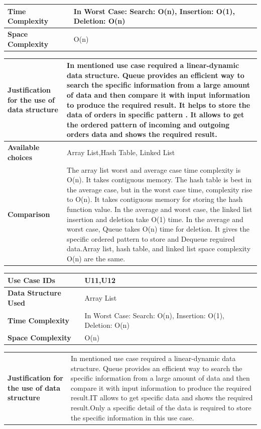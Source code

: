 \documentclass[12pt,a4paper]{report}
\begin{document}
\begin{center}
\begin{tabular}{ | m{4cm}|m{12cm}| }
\textbf{Time Complexity}& 
In Worst Case: Search: O(n), Insertion: O(1), Deletion: O(n)\\\hline
\textbf{Space Complexity}& O(n)\\\hline

 \end{tabular}
\begin{tabular}{ | m{4cm}|m{12cm}| }\hline
\textbf{Justification for the use of data structure}&
In mentioned use case required a linear-dynamic data structure. 
Queue provides an efficient way to search the specific information from a large amount of data and then compare it with input information to produce the required result. It helps to store the data of orders in specific pattern . It allows  to get the ordered pattern of incoming and outgoing orders data and shows the required result.
 
 \\ \hline
\textbf{Available choices}& Array List,Hash Table, Linked List \\ \hline
\textbf{Comparison}&
The array list worst and average case time complexity is O(n). It takes contiguous memory. The hash table is best in the average case, but in the worst case time, complexity rise to O(n). It takes contiguous memory for storing the hash function value. In the average and worst case, the linked list insertion and deletion take O(1) time. In the average and worst case, Queue takes O(n) time for deletion. It gives the specific ordered pattern to store and Dequeue reguired data.Array list, hash table, and linked list space complexity O(n) are the same.
 \\ \hline
\end{tabular}

\begin{tabular}{ | m{4cm}|m{12cm}| }\hline
\textbf{Use Case IDs}& U11,U12 \\ \hline
\textbf{Data Structure Used}& Array List \\ \hline

\textbf{Time Complexity}& 
In Worst Case: Search: O(n), Insertion: O(1), Deletion: O(n)\\\hline
\textbf{Space Complexity}& O(n)\\\hline

 \end{tabular}
\begin{tabular}{ | m{4cm}|m{12cm}| }\hline
\textbf{Justification for the use of data structure}&
In mentioned use case required a linear-dynamic data structure. 
Queue provides an efficient way to search the specific information from a large amount of data and then compare it with input information to produce the required result.IT allows to get specific data and shows  the required result.Only a specific detail of the data is required to store the specific information in this use case. 
 

\end{tabular}
\end{center}
\end{document}

